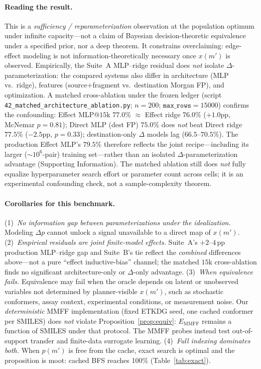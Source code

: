 \paragraph{Reading the result.}
This is a \emph{sufficiency / reparameterization} observation at the population optimum under infinite capacity---not a claim of Bayesian decision-theoretic equivalence under a specified prior, nor a deep theorem. It constrains overclaiming: edge-effect modeling is not information-theoretically necessary once $x(m')$ is observed. Empirically, the Suite~A MLP--ridge residual does \emph{not} isolate $\Delta$-parameterization: the compared systems also differ in architecture (MLP vs.\ ridge), features (source$+$fragment vs.\ destination Morgan FP), and optimization. A matched cross-ablation under the frozen ledger (script \texttt{42\_matched\_architecture\_ablation.py}; $n{=}200$; $\texttt{max\_rows}{=}15000$) confirms the confounding: Effect MLP@$15$k $77.0\%$ $\approx$ Effect ridge $76.0\%$ ($+1.0$pp, McNemar $p{=}0.81$); Direct MLP (dest FP) $75.0\%$ does \emph{not} beat Direct ridge $77.5\%$ ($-2.5$pp, $p{=}0.33$); destination-only $\Delta$ models lag ($66.5$--$70.5\%$). The production Effect MLP's $79.5\%$ therefore reflects the joint recipe---including its larger ($\sim$$10^6$-pair) training set---rather than an isolated $\Delta$-parameterization advantage (Supporting Information). The matched ablation still does \emph{not} fully equalize hyperparameter search effort or parameter count across cells; it is an experimental confounding check, not a sample-complexity theorem.

\paragraph{Corollaries for this benchmark.}
(1)~\emph{No information gap between parameterizations under the idealization.} Modeling $\Delta p$ cannot unlock a signal unavailable to a direct map of $x(m')$. (2)~\emph{Empirical residuals are joint finite-model effects.} Suite~A's $+2$--$4$\,pp production MLP--ridge gap and Suite~B's tie reflect the \emph{combined} differences above---not a pure ``effect inductive-bias'' channel; the matched $15$k cross-ablation finds no significant architecture-only or $\Delta$-only advantage. (3)~\emph{When equivalence fails.} Equivalence may fail when the oracle depends on latent or unobserved variables not determined by planner-visible $x(m')$, such as stochastic conformers, assay context, experimental conditions, or measurement noise. Our \emph{deterministic} MMFF implementation (fixed ETKDG seed, one cached conformer per SMILES) does \emph{not} violate Proposition~\ref{prop:equiv}: $E_{\mathrm{MMFF}}$ remains a function of SMILES under that protocol. The MMFF probes instead test out-of-support transfer and finite-data surrogate learning. (4)~\emph{Full indexing dominates both.} When $p(m')$ is free from the cache, exact search is optimal and the proposition is moot: cached BFS reaches 100\% (Table~\ref{tab:exact}).


